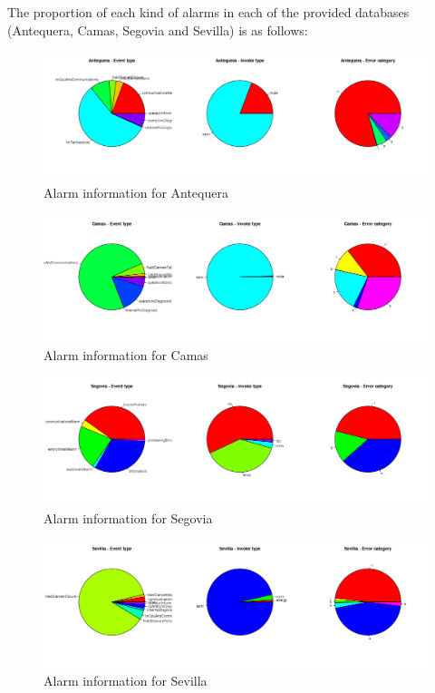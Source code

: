 \documentclass[a4paper,10pt]{article}
\begin{document}
The proportion of each kind of alarms in each of the provided databases (Antequera, Camas, Segovia and Sevilla) is as follows:
\begin{figure}[ht!]
 \centering
 \includegraphics[width=\textwidth]{./img/antequera_graph.png}
 \caption{Alarm information for Antequera}
 \label{fig:anteq}
\end{figure}
\begin{figure}[ht!]
 \centering
 \includegraphics[width=\textwidth]{./img/camas_graph.png}
 \caption{Alarm information for Camas}
 \label{fig:camas}
\end{figure}
\begin{figure}[ht!]
 \centering
 \includegraphics[width=\textwidth]{./img/segovia_graph.png}
 \caption{Alarm information for Segovia}
 \label{fig:segovia}
\end{figure}
\begin{figure}[ht!]
 \centering
 \includegraphics[width=\textwidth]{./img/sevilla_graph.png}
 \caption{Alarm information for Sevilla}
 \label{fig:sevilla}
\end{figure}
\end{document}
